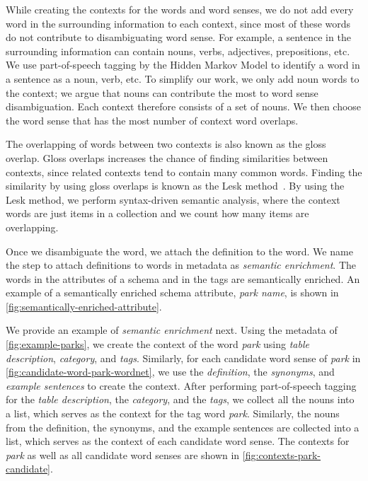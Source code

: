 While creating the contexts for the words and word senses, we do not add every word in the surrounding information to each context, since most of these words do not contribute to disambiguating word sense. For example, a sentence in the surrounding information can contain nouns, verbs, adjectives, prepositions, etc. We use part-of-speech tagging by the Hidden Markov Model to identify a word in a sentence as a noun, verb, etc. To simplify our work, we only add noun words to the context; we argue that nouns can contribute the most to word sense disambiguation. Each context therefore consists of a set of nouns. We then choose the word sense that has the most number of context word overlaps.

The overlapping of words between two contexts is also known as the gloss overlap. Gloss overlaps increases the chance of finding similarities between contexts, since related contexts tend to contain many common words. Finding the similarity by using gloss overlaps is known as the Lesk method~\cite{lesk1986automatic}. By using the Lesk method, we perform syntax-driven semantic analysis, where the context words are just items in a collection and we count how many items are overlapping.

Once we disambiguate the word, we attach the definition to the word. We name the step to attach definitions to words in metadata as \textit{semantic enrichment}. The words in the attributes of a schema and in the tags are semantically enriched. An example of a semantically enriched schema attribute, \textit{park name}, is shown in \autoref{fig:semantically-enriched-attribute}.

We provide an example of \textit{semantic enrichment} next. Using the metadata of \autoref{fig:example-parks}, we create the context of the word \textit{park} using \textit{table description}, \textit{category}, and \textit{tags}. Similarly, for each candidate word sense of \textit{park} in \autoref{fig:candidate-word-park-wordnet}, we use the \textit{definition}, the \textit{synonyms}, and \textit{example sentences} to create the context. After performing part-of-speech tagging for the \textit{table description}, the \textit{category}, and the \textit{tags}, we collect all the nouns into a list, which serves as the context for the tag word \textit{park}. Similarly, the nouns from the definition, the synonyms, and the example sentences are collected into a list, which serves as the context of each candidate word sense. The contexts for \textit{park} as well as all candidate word senses are shown in \autoref{fig:contexts-park-candidate}.

